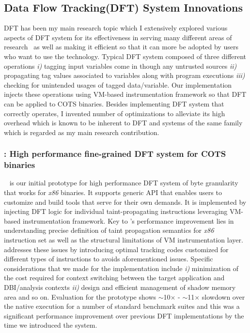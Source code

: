 \documentclass[letterpaper, 10pt]{article}
\begin{document}
\begin{small}
\subsection*{Data Flow Tracking(DFT) System Innovations} 
%
DFT has been my main research topic which I extensively explored various
aspects of DFT system for its effectiveness in serving many different areas of
research~\cite{libdft:2012vee, tfa:2012ndss, sreplica:2013ccs} as well as
making it efficient so that it can more be adopted by users who want to use the
technology.
%
Typical DFT system composed of three different operations {\it i)} tagging
input variables come in though any untrusted sources {\it ii)} propagating tag
values associated to variables along with program executions {\it iii)}
checking for unintended usages of tagged data/variable. Our implementation
injects these operations using VM-based instrumentation framework so that DFT
can be applied to COTS binaries.
%
Besides implementing DFT system that correctly operates, I invented number of
optimizations to alleviate its high overhead which is known to be inherent to
DFT and systems of the same family which is regarded as my main research
contribution.

\subsubsection*{\libdft: High performance fine-grained DFT system for COTS binaries}

\libdft~\cite{libdft:2012vee} is our initial prototype for high performance DFT
system of byte granularity that works for {\it x86} binaries. 
%
It supports generic API that enables users to customize and build tools that
serve for their own demands. 
%
It is implemented by injecting DFT logic for individual taint-propagating
instructions leveraging VM-based instrumentation framework. 
%
Key to \libdft's performance improvement lies in understanding precise
definition of taint propagation semantics for {\it x86} instruction set as well
as the structural limitations of VM instrumentation layer. \libdft  addresses
these issues by introducing optimal tracking codes customized for different
types of instructions to avoids aforementioned issues. Specific considerations
that we made for the implementation include {\it i)} minimization of the cost
required for context switching between the target application and DBI/analysis
contexts {\it ii)} design and efficient management of shadow memory area and so
on. 
%
Evaluation for the prototype shows $\sim$10$\times$ - $\sim$11$\times$
slowdown over the native execution for a number of standard benchmark suites
and this was a significant performance improvement over previous DFT
implementations by the time we introduced the system.


\end{small}
\end{document}

